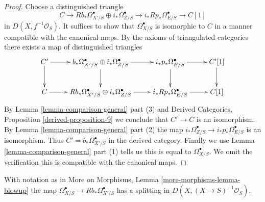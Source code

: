 \begin{proof}
Choose a distinguished triangle
$$
C \to Rb_*\Omega^\bullet_{X'/S} \oplus i_*\Omega^\bullet_{Z/S}
\to i_*Rp_*\Omega^\bullet_{E/S} \to C[1]
$$
in $D(X, f^{-1}\mathcal{O}_S)$. It suffices to show that
$\Omega^\bullet_{X/S}$ is isomorphic to $C$ in a manner compatible
with the canonical maps. By the axioms of triangulated categories
there exists a map of distinguished triangles
$$
\xymatrix{
C' \ar[r] \ar[d] &
b_*\Omega^\bullet_{X'/S} \oplus i_*\Omega^\bullet_{Z/S} \ar[r] \ar[d] &
i_*p_*\Omega^\bullet_{E/S} \ar[r] \ar[d] &
C'[1] \ar[d] \\
C \ar[r] &
Rb_*\Omega^\bullet_{X'/S} \oplus i_*\Omega^\bullet_{Z/S} \ar[r] &
i_*Rp_*\Omega^\bullet_{E/S} \ar[r] &
C[1]
}
$$
By Lemma \ref{lemma-comparison-general} part (3) and
Derived Categories, Proposition \ref{derived-proposition-9} we conclude that
$C' \to C$ is an isomorphism. By Lemma \ref{lemma-comparison-general} part (2)
the map $i_*\Omega^\bullet_{Z/S} \to i_*p_*\Omega^\bullet_{E/S}$
is an isomorphism. Thus $C' = b_*\Omega^\bullet_{X'/S}$
in the derived category. Finally we use Lemma \ref{lemma-comparison-general}
part (1) tells us this is equal to $\Omega^\bullet_{X/S}$.
We omit the verification this is compatible with the canonical maps.
\end{proof}

\begin{proposition}
\label{proposition-blowup-split}
With notation as in More on Morphisms, Lemma \ref{more-morphisms-lemma-blowup}
the map $\Omega^\bullet_{X/S} \to Rb_*\Omega^\bullet_{X'/S}$
has a splitting in $D(X, (X \to S)^{-1}\mathcal{O}_S)$.
\end{proposition}

